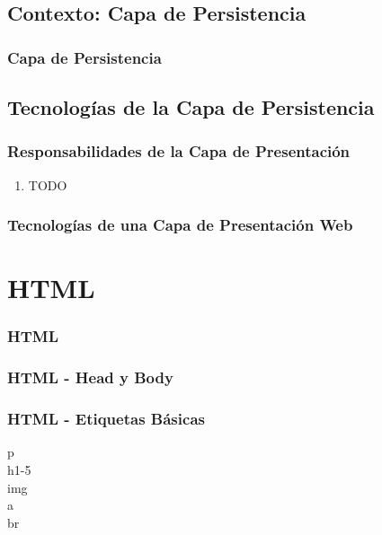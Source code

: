 \documentclass[a4paper,slidestop,xcolor=pst,blue]{beamer}
\begin{document}
\subsection{Contexto: Capa de Persistencia}

\begin{frame}
    \frametitle{Capa de Persistencia}
\end{frame}

\subsection{Tecnologías de la Capa de Persistencia}

\begin{frame}[c]
	\frametitle{Responsabilidades de la Capa de Presentación}
	\begin{enumerate}[<+->]
        \item TODO
	\end{enumerate}
\end{frame}

\begin{frame}[c]
    \frametitle{Tecnologías de una Capa de Presentación Web}
\end{frame}

\section{HTML}

\begin{frame}[c]
    \frametitle{HTML}
\end{frame}

\begin{frame}[c]
    \frametitle{HTML - Head y Body}
\end{frame}

\begin{frame}[c]
    \frametitle{HTML - Etiquetas Básicas}
    \begin{description}
        \item[p]
        \item[h1-5]
        \item[img]
        \item[a]
        \item[br]
    \end{description}
\end{frame}
\end{document}
